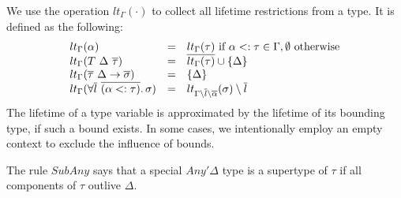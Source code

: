 \documentclass[11pt]{article}
\newcommand{\ap}{~}
\begin{document}
    We use the operation $lt_\Gamma(\cdot)$ to collect all lifetime restrictions from a type.
    It is defined as the following:
    \[
        \begin{array}{lll}
            lt_\Gamma(\alpha)                                                         & = & lt_\Gamma(\tau) \text{ if } \alpha <: \tau \in \Gamma, \emptyset \text{ otherwise}        \\
            lt_\Gamma(T\ap\Delta\ap\overline{\tau})                                   & = & \overline{lt_\Gamma(\tau)} \cup \{\Delta\}                                                \\
            lt_\Gamma(\overline{\tau}~\Delta\to\overline{\sigma})                     & = & \{\Delta\}                                                                                \\
            lt_{\Gamma}(\forall \overline{l}~\overline{(\alpha <: \tau)}\ldotp\sigma) & = & lt_{\Gamma\setminus\overline{l}\setminus\overline{\alpha}}(\sigma) \setminus \overline{l} %
        \end{array}
    \]
    The lifetime of a type variable is approximated by the lifetime of its bounding type, if such a bound exists.
    In some cases, we intentionally employ an empty context to exclude the influence of bounds.

    The rule $SubAny$ says that a special $Any'\Delta$ type is a supertype of $\tau$ if all components of $\tau$ outlive $\Delta$.

\end{document}
